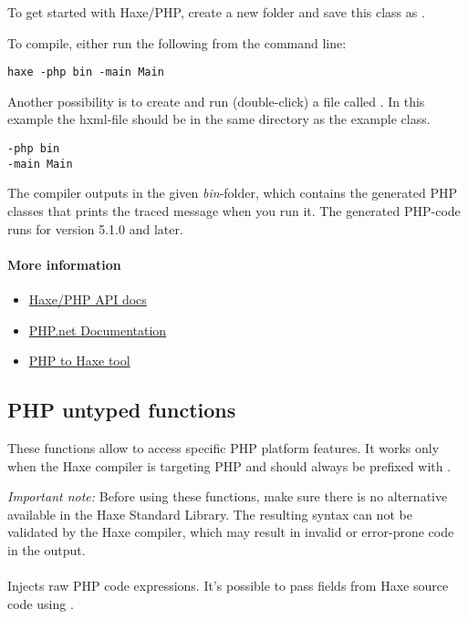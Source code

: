 To get started with Haxe/PHP, create a new folder and save this class as .


To compile, either run the following from the command line:

\begin{lstlisting}
haxe -php bin -main Main
\end{lstlisting}

Another possibility is to create and run (double-click) a file called . In this example the hxml-file should be in the same directory as the example class.

\begin{lstlisting}
-php bin
-main Main
\end{lstlisting}

The compiler outputs in the given \emph{bin}-folder, which contains the generated PHP classes that prints the traced message when you run it. The generated PHP-code runs for version 5.1.0 and later.

\paragraph{More information}

\begin{itemize}
	\item \href{http://api.haxe.org/php/}{Haxe/PHP API docs}
	\item \href{http://php.net/docs.php}{PHP.net Documentation}
	\item \href{http://phptohaxe.haqteam.com/code.php}{PHP to Haxe tool}
\end{itemize}


\subsection{PHP untyped functions}
\label{target-php-untyped}

These functions allow to access specific PHP platform features. It works only when the Haxe compiler is targeting PHP and should always be prefixed with . 

\emph{Important note:} Before using these functions, make sure there is no alternative available in the Haxe Standard Library. The resulting syntax can not be validated by the Haxe compiler, which may result in invalid or error-prone code in the output.

\paragraph{}
Injects raw PHP code expressions. It's possible to pass fields from Haxe source code using .

